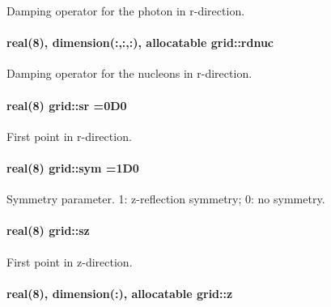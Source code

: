 Damping operator for the photon in r-\/direction. 

\paragraph[{\texorpdfstring{rdnuc}{rdnuc}}]{\setlength{\rightskip}{0pt plus 5cm}real(8), dimension(\+:,\+:,\+:), allocatable grid\+::rdnuc}\hypertarget{namespacegrid_ab4cf4ad8b469e501cd06fbe82300f2ee}{}\label{namespacegrid_ab4cf4ad8b469e501cd06fbe82300f2ee}


Damping operator for the nucleons in r-\/direction. 

\paragraph[{\texorpdfstring{sr}{sr}}]{\setlength{\rightskip}{0pt plus 5cm}real(8) grid\+::sr =0\+D0}\hypertarget{namespacegrid_ac01da4440df8a87994cbe84c6fe756b1}{}\label{namespacegrid_ac01da4440df8a87994cbe84c6fe756b1}


First point in r-\/direction. 

\paragraph[{\texorpdfstring{sym}{sym}}]{\setlength{\rightskip}{0pt plus 5cm}real(8) grid\+::sym =1\+D0}\hypertarget{namespacegrid_a5da7a7ed94ce1ad125820c9e731998ab}{}\label{namespacegrid_a5da7a7ed94ce1ad125820c9e731998ab}


Symmetry parameter. 1\+: z-\/reflection symmetry; 0\+: no symmetry. 

\paragraph[{\texorpdfstring{sz}{sz}}]{\setlength{\rightskip}{0pt plus 5cm}real(8) grid\+::sz}\hypertarget{namespacegrid_a1368c70ae54f199b68ccfa8672252bf9}{}\label{namespacegrid_a1368c70ae54f199b68ccfa8672252bf9}


First point in z-\/direction. 

\paragraph[{\texorpdfstring{z}{z}}]{\setlength{\rightskip}{0pt plus 5cm}real(8), dimension(\+:), allocatable grid\+::z}\hypertarget{namespacegrid_a70452110896f967bfa9712b77c0bd3de}{}\label{namespacegrid_a70452110896f967bfa9712b77c0bd3de}



